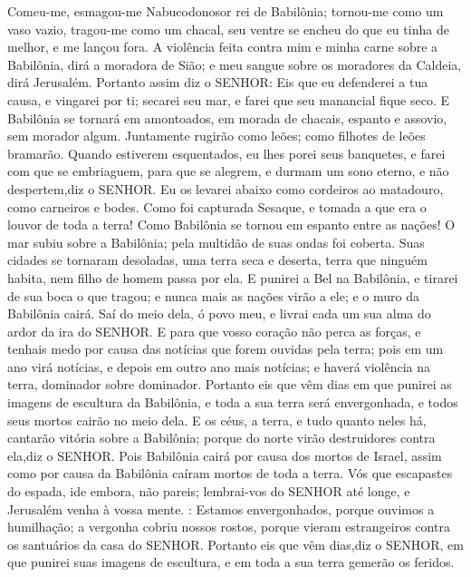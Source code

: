 {Comeu-me, esmagou-me Nabucodonosor rei de Babilônia; tornou-me como um vaso vazio, tragou-me como um chacal, seu ventre se encheu do que eu tinha de melhor, e me lançou fora.
A violência feita contra mim e minha carne
{} sobre a Babilônia, dirá a moradora de Sião; e meu sangue sobre os moradores da Caldeia, dirá Jerusalém.
Portanto assim diz o SENHOR: Eis que eu defenderei a tua causa, e vingarei por ti; secarei seu mar, e farei que seu manancial fique seco.
E Babilônia se tornará em amontoados, em morada de chacais, espanto e assovio, sem morador algum.
Juntamente rugirão como leões; como filhotes de leões bramarão.
Quando estiverem esquentados, eu lhes porei seus banquetes, e farei com que se embriaguem, para que se alegrem, e durmam um sono eterno, e não despertem,diz o SENHOR.
Eu os levarei abaixo como cordeiros ao matadouro, como carneiros e bodes.
Como foi capturada Sesaque, e tomada a que era o louvor de toda a terra! Como Babilônia se tornou em espanto entre as nações!
O mar subiu sobre a Babilônia; pela multidão de suas ondas foi coberta.
Suas cidades se tornaram desoladas, uma terra seca e deserta, terra que ninguém habita, nem filho de homem passa por ela.
E punirei a Bel na Babilônia, e tirarei de sua boca o que tragou; e nunca mais as nações virão a ele; e o muro da Babilônia cairá.
Saí do meio dela, ó povo meu, e livrai cada um sua alma do ardor da ira do SENHOR.
E para que vosso coração não perca as forças, e tenhais medo por causa das notícias que forem ouvidas pela terra; pois em um ano virá notícias, e depois em outro ano mais notícias; e haverá violência na terra, dominador sobre dominador.
Portanto eis que vêm dias em que punirei as imagens de escultura da Babilônia, e toda a sua terra será envergonhada, e todos seus mortos cairão no meio dela.
E os céus, a terra, e tudo quanto neles há, cantarão vitória sobre a Babilônia; porque do norte virão destruidores contra ela,diz o SENHOR.
Pois Babilônia cairá por causa dos mortos de Israel, assim como por causa da Babilônia caíram mortos de toda a terra.
Vós que escapastes do espada, ide embora, não pareis; lembrai-vos do SENHOR até longe, e Jerusalém venha à vossa mente.
 : Estamos envergonhados, porque ouvimos a humilhação; a vergonha cobriu nossos rostos, porque vieram estrangeiros contra os santuários da casa do SENHOR.
Portanto eis que vêm dias,diz o SENHOR, em que punirei suas imagens de escultura, e em toda a sua terra gemerão os feridos.
}
